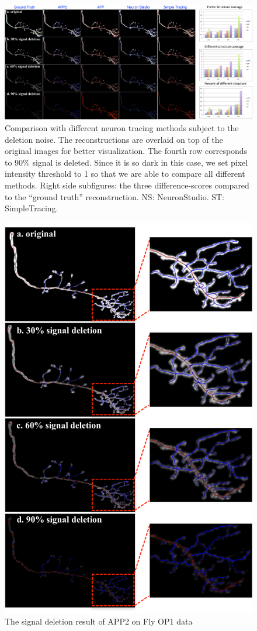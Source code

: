 \begin{figure}[htbp]
\centering
\includegraphics[width=1.0\textwidth]{images/autont_fig3}
\caption[Comparison with different neuron tracing methods subject to the deletion noise]{Comparison with different neuron tracing methods subject to the deletion noise. The reconstructions are overlaid on top of the original images for better visualization. The fourth row corresponds to 90\% signal is deleted. Since it is so dark in this case, we set pixel intensity threshold to 1 so that we are able to compare all different methods. Right side subfigures: the three difference-scores compared to the “ground truth” reconstruction. NS: NeuronStudio. ST: SimpleTracing.}
\label{fig:autont-fig3}
\end{figure}
\begin{figure}[htbp]
\centering
\includegraphics[width=.7\textwidth]{images/autont_fig3_2}
\caption{The signal deletion result of APP2 on Fly OP1 data}
\label{fig:autont-fig3-2}
\end{figure}

